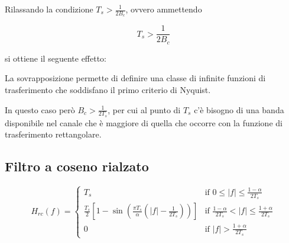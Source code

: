 \documentclass{article}
\begin{document}
Rilassando la condizione $T_s > \frac{1}{2B_c}$, ovvero ammettendo

\[ T_s > \frac{1}{2B_c} \]

si ottiene il seguente effetto:

\begin{center}
    
\end{center}

La sovrapposizione permette di definire una classe di infinite funzioni di trasferimento che soddisfano il primo criterio di Nyquist.

In questo caso però $B_c > \frac{1}{2T_s}$, per cui al punto di $T_s$ c'è bisogno di una banda disponibile nel canale che è maggiore di quella che occorre con la funzione di trasferimento rettangolare.

\subsection*{Filtro a coseno rialzato}

\[ H_{rc}(f) = 
  \begin{cases} 
   T_s & \text{if } 0 \leq |f| \leq \frac{1-\alpha}{2T_s} \\
   \frac{T_s}{2} \left[ 1 - \sin\left(\frac{\pi T_s}{\alpha} \left( |f| - \frac{1}{2T_s} \right)\right) \right] & \text{if } \frac{1-\alpha}{2T_s} < |f| \leq \frac{1+\alpha}{2T_s} \\
   0 & \text{if } |f| > \frac{1+\alpha}{2T_s}
  \end{cases}
\]
\end{document}
